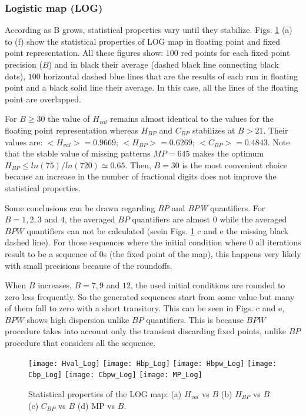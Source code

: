 \subsubsection{Logistic map (LOG)} \label{subsubsec:log}

According as B grows, statistical properties vary until they stabilize.
Figs. \ref{fig:LOG_QuantiB} (a) to (f) show the statistical properties of LOG map in floating point and fixed point representation.
All these figures show: $100$ red points for each fixed point precision ($B$) and in black their average (dashed black line connecting black dots), $100$ horizontal dashed blue lines that are the results of each run in floating point and a black solid line their average.
In this case, all the lines of the floating point are overlapped.

For $B\geq 30$ the value of $H_{val}$ remains almost identical to the values for the floating point representation whereas $H_{BP}$ and $C_{BP}$ stabilizes at $B>21$.
Their values are: $<H_{val}>=0.9669$; $<H_{BP}>=0.6269$; $<C_{BP}>=0.4843$.
Note that the stable value of missing patterns $MP=645$ makes the optimum $H_{BP} \leq ln(75)/ln(720) \simeq 0.65$.
Then, $B=30$ is the most convenient choice because an increase in the number of fractional digits does not improve the statistical properties.

Some conclusions can be drawn regarding \textit{BP} and \textit{BPW} quantifiers.
For $B=1, 2, 3$ and $4$, the averaged $BP$ quantifiers are almost $0$ while the averaged $BPW$ quantifiers can not be calculated (seein Figs. \ref{fig:LOG_QuantiB} c and e the missing black dashed line).
For those sequences where the initial condition where $0$ all iterations result to be a sequence of $0$s (the fixed point of the map), this happens very likely with small precisions because of the roundoffs.

When $B$ increases, $B=7, 9$ and $12$, the used initial conditions are rounded to zero less frequently.
So the generated sequences start from some value but many of them fall to zero with a short transitory.
This can be seen in Figs. c and e, $BPW$ shows high dispersion unlike $BP$ quantifiers.
This is because $BPW$ procedure takes into account only the transient discarding fixed points, unlike $BP$ procedure that considers all the sequence. 

\begin{figure}
	\texttt{[image: Hval\_Log]}
	\texttt{[image: Hbp\_Log]}
	\texttt{[image: Hbpw\_Log]}
	\texttt{[image: Cbp\_Log]}
	\texttt{[image: Cbpw\_Log]}
	\texttt{[image: MP\_Log]}
	\caption{Statistical properties of the LOG map: (a) $H_{val}$ vs $B$ (b) $H_{BP}$ vs $B$ (c) $C_{BP}$ vs $B$ (d) MP vs $B$.}
	\label{fig:LOG_QuantiB}
\end{figure}

